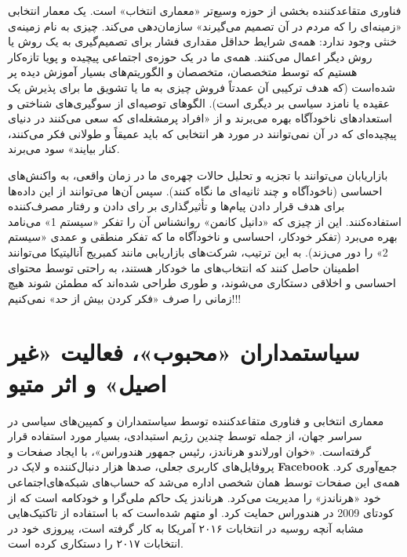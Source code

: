 فناوری متقاعدکننده بخشی از حوزه وسیع‌تر «معماری انتخاب» است.
یک معمار انتخابی «زمینه‌ای را که مردم در آن تصمیم می‌گیرند» سازمان‌دهی می‌کند.
چیزی به نام زمینه‌ی خنثی وجود ندارد: همه‌ی شرایط حداقل مقداری فشار برای تصمیم‌گیری به یک روش یا روش دیگر اعمال می‌کنند.
همه‌ی ما در یک حوزه‌ی اجتماعی پیچیده و پویا تازه‌کار هستیم که توسط متخصصان، متخصصان و الگوریتم‌های بسیار آموزش دیده پر شده‌است (که هدف ترکیبی آن عمدتاً فروش چیزی به ما یا تشویق ما برای پذیرش یک عقیده یا نامزد سیاسی بر دیگری است).
الگوهای توصیه‌ای از سوگیری‌های شناختی و استعدادهای ناخودآگاه بهره می‌برند و از «افراد پرمشغله‌ای که سعی می‌کنند در دنیای پیچیده‌ای که در آن نمی‌توانند در مورد هر انتخابی که باید عمیقاً و طولانی فکر می‌کنند، کنار بیایند» سود می‌برند.

بازاریابان می‌توانند با تجزیه و تحلیل حالات چهره‌ی ما در زمان واقعی، به واکنش‌های احساسی (ناخودآگاه و چند ثانیه‌ای ما نگاه کنند).
سپس آن‌ها می‌توانند از این داده‌ها برای هدف قرار دادن پیام‌ها و تأثیرگذاری بر رای دادن و رفتار مصرف‌کننده استفاده‌کنند.
این از چیزی که «دانیل کانمن» روانشناس آن را تفکر «سیستم 1» می‌نامد بهره می‌برد (تفکر خودکار، احساسی و ناخودآگاه ما که تفکر منطقی و عمدی «سیستم 2» را دور می‌زند).
به این ترتیب، شرکت‌های بازاریابی مانند کمبریج آنالیتیکا می‌توانند اطمینان حاصل کنند که انتخاب‌های ما خودکار هستند، به راحتی توسط محتوای احساسی و اخلاقی دستکاری می‌شوند، و طوری طراحی شده‌اند که مطمئن شوند هیچ زمانی را صرف «فکر کردن بیش از حد» نمی‌کنیم!!!
\newline
\newline


{
\section*{سیاستمداران «محبوب»، فعالیت «غیر اصیل» و اثر متیو}
\label{sec:سیاستمداران «محبوب»، فعالیت «غیر اصیل» و اثر متیو}
معماری انتخابی و فناوری متقاعدکننده توسط سیاستمداران و کمپین‌های سیاسی در سراسر جهان، از جمله توسط چندین رژیم استبدادی، بسیار مورد استفاده قرار گرفته‌است.
«خوان اورلاندو هرناندز، رئیس جمهور هندوراس»، با ایجاد صفحات و پروفایل‌های کاربری جعلی، صدها هزار دنبال‌کننده و لایک در \textenglish{\textbf{Facebook}} جمع‌آوری کرد.
همه‌ی این صفحات توسط همان شخصی اداره می‌شد که حساب‌های شبکه‌های‌اجتماعی خود «هرناندز» را مدیریت می‌کرد.
هرناندز یک حاکم ملی‌گرا و خودکامه است که از کودتای 2009 در هندوراس حمایت کرد.
او متهم شده‌است که با استفاده از تاکتیک‌هایی مشابه آنچه روسیه در انتخابات ۲۰۱۶ آمریکا به کار گرفته است، پیروزی خود در انتخابات ۲۰۱۷ را دستکاری کرده است.
}

